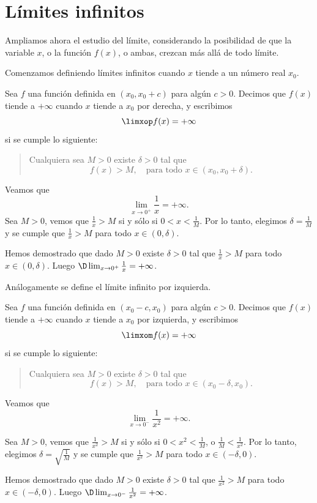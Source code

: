 \section{Límites infinitos}

Ampliamos ahora el estudio del límite, considerando la posibilidad de que la variable $x$, o la función $f(x)$, o ambas, crezcan más allá de todo límite.

Comenzamos definiendo límites infinitos cuando $x$ tiende a un número real $x_0$.

\begin{definition}
    Sea $f$ una función definida en $(x_0,x_0+c)$ para algún $c>0$.
    Decimos que $f(x)$ tiende a $+\infty$ cuando $x$ tiende a $x_0$ por derecha, y escribimos
    \[
    \limxop f(x)=+\infty
    \]
    si se cumple lo siguiente:
    \begin{quote}
        Cualquiera sea $M>0$ existe $\delta>0$ tal que
        \[
        f(x)>M,\quad\text{para todo $x\in(x_0,x_0+\delta)$}.
        \]
    \end{quote}
\end{definition}

\begin{example}
    Veamos que 
    \[
    \lim_{x\to0^+} \frac1x = +\infty.
    \]
    Sea $M>0$, vemos que $\frac1x>M$ si y sólo si $0<x<\frac1M$. Por lo tanto, elegimos $\delta=\frac1M$ y se cumple que $\frac1x>M$ para todo $x\in(0,\delta)$.

    Hemos demostrado que dado $M>0$ existe $\delta>0$ tal que $\frac1x>M$ para todo $x\in(0,\delta)$.
    Luego $\D \lim_{x\to0^+} \frac1x = +\infty$.
\end{example}

Análogamente se define el límite infinito por izquierda.

\begin{definition}
    Sea $f$ una función definida en $(x_0-c,x_0)$ para algún $c>0$.
    Decimos que $f(x)$ tiende a $+\infty$ cuando $x$ tiende a $x_0$ por izquierda, y escribimos
    \[
    \limxom f(x)=+\infty
    \]
    si se cumple lo siguiente:
    \begin{quote}
        Cualquiera sea $M>0$ existe $\delta>0$ tal que
        \[
        f(x)>M,\quad\text{para todo $x\in(x_0-\delta,x_0)$}.
        \]
    \end{quote}
\end{definition}

\begin{example}
    Veamos que 
    \[
    \lim_{x\to0^-} \frac1{x^2} = +\infty.
    \]

    Sea $M>0$, vemos que $\frac1{x^2}>M$ si y sólo si $0<x^2<\frac1M$, o $\frac1M<\frac{1}{x^2}$. Por lo tanto, elegimos $\delta=\sqrt{\frac1M}$ y se cumple que $\frac1{x^2}>M$ para todo $x\in(-\delta,0)$.

    Hemos demostrado que dado $M>0$ existe $\delta>0$ tal que $\frac1{x^2}>M$ para todo $x\in(-\delta,0)$.
    Luego $\D \lim_{x\to0^-} \frac1{x^2} = +\infty$.
\end{example}

